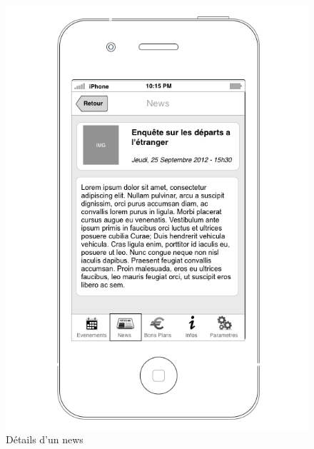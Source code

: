 \documentclass[a4paper, 11pt]{article}
\begin{document}
\begin{figure}[h!]
\begin{minipage}[c]{.50\linewidth}
	\end{minipage}
	\hfill
	\begin{minipage}[c]{.50\linewidth}
		\begin{center}
			\includegraphics[scale=0.3]{../../Sketch/iOS/news_detail.png}
		\end{center}
	\caption{Détails d'un news}
	\end{minipage}
\end{figure}
\end{document}

